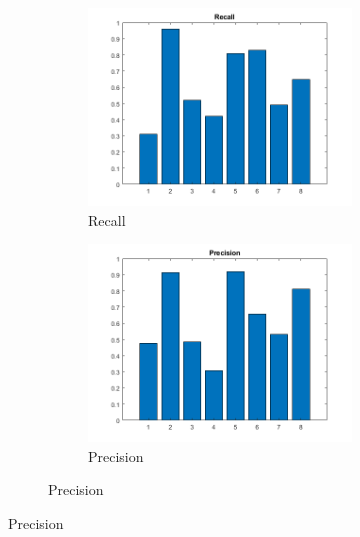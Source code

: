 \begin{figure}[h]

	\centering
	\begin{subfigure}{0.3\textwidth}
		\begin{subfigure}[t]{\textwidth}
			\includegraphics[width=\textwidth]{figures/recall_75C_5NN_2S.png} 
			\caption{Recall}
		\end{subfigure}
		\begin{subfigure}[t]{\textwidth}
			\includegraphics[width=\textwidth]{figures/precision_75C_5NN_2S.png}
			\caption{Precision}
		\end{subfigure}


\end{subfigure}
\end{figure}
